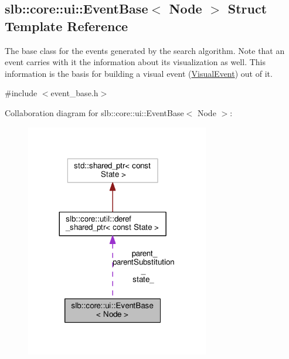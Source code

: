 \hypertarget{structslb_1_1core_1_1ui_1_1EventBase}{}\subsection{slb\+:\+:core\+:\+:ui\+:\+:Event\+Base$<$ Node $>$ Struct Template Reference}
\label{structslb_1_1core_1_1ui_1_1EventBase}


The base class for the events generated by the search algorithm. Note that an event carries with it the information about its visualization as well. This information is the basis for building a visual event (\hyperlink{structslb_1_1core_1_1ui_1_1VisualEvent}{Visual\+Event}) out of it.  




{\ttfamily \#include $<$event\+\_\+base.\+h$>$}



Collaboration diagram for slb\+:\+:core\+:\+:ui\+:\+:Event\+Base$<$ Node $>$\+:\nopagebreak
\begin{figure}[H]
\begin{center}
\leavevmode
\includegraphics[width=227pt]{structslb_1_1core_1_1ui_1_1EventBase__coll__graph}
\end{center}
\end{figure}
